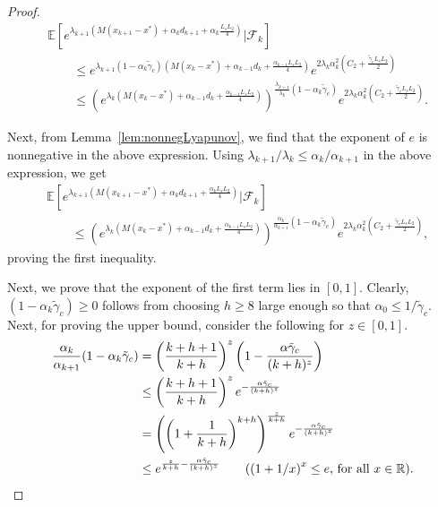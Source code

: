 \documentclass{article}
\newcommand{\numberthis}{\addtocounter{equation}{1}\tag{\theequation}}
\newcommand{\lrp}[1]{\left( #1 \right)}
\newcommand{\lrs}[1]{\left[ #1 \right]}
\newcommand{\E}[1]{\mathbb{E}\lrs{#1}}
\newcommand{\R}{\mathbb{R}}
\newcommand{\xk}{x_k}
\begin{document}
\begin{proof}
\begin{align*}
        &\E{ e^{\lambda_{k+1}\lrp{M(x_{k+1} - x^*) + \alpha_k d_{k+1} + \alpha_k \frac{L_s L_2}{4} }} \big| \mathcal F_k }\\
        &\qquad \le e^{ \lambda_{k+1}(1-\alpha_k \tilde{\gamma}_c)\lrp{M(\xk - x^*) + \alpha_{k-1}d_k + \frac{\alpha_{k-1} L_sL_2}{4} } }  e^{2 \lambda_k \alpha^2_k \lrp{C_2 + \frac{\tilde{\gamma}_c L_sL_2}{2} }}\\
        &\qquad \le \lrp{e^{ \lambda_{k}\lrp{ M(\xk - x^*) + \alpha_{k-1}d_k + \frac{\alpha_{k-1} L_sL_2}{4} }}}^{\frac{\lambda_{k+1}}{\lambda_k}(1-\alpha_k \tilde{\gamma}_c)}  e^{2 \lambda_k \alpha^2_k \lrp{C_2 + \frac{\tilde{\gamma}_c L_sL_2}{2} }}.
\end{align*}    

Next, from Lemma~\ref{lem:nonnegLyapunov}, we find that the exponent of $e$ is nonnegative in the above expression. Using $\lambda_{k+1}/\lambda_k \le \alpha_k/\alpha_{k+1}$ in the above expression, we get 
\begin{align*}
        &\E{ e^{\lambda_{k+1}\lrp{M(x_{k+1} - x^*) + \alpha_k d_{k+1} + \frac{\alpha_k L_sL_2 }{4 } }} \big| \mathcal F_k }\\
        &\qquad \le \lrp{e^{ \lambda_{k}\lrp{ M(\xk - x^*) + \alpha_{k-1}d_k + \frac{\alpha_{k-1} L_sL_2}{4}}}}^{\frac{\alpha_{k}}{\alpha_{k+1}}(1-\alpha_k \tilde{\gamma}_c)}  e^{2 \lambda_k \alpha^2_k \lrp{C_2 + \frac{\tilde{\gamma}_c L_sL_2}{2} }},%
\end{align*}
proving the first inequality.

Next, we prove that the exponent of the first term lies in $[0,1]$. Clearly, $(1-\alpha_k \tilde{\gamma}_c) \ge 0$ follows from choosing $h \ge 8$ large enough so that $\alpha_0 \le 1/\tilde{\gamma}_c$. Next, for proving the upper bound, consider the following for $z \in [0,1]$. 
\begin{align*}
    \frac{\alpha_k }{\alpha_{k+1}}(1-\alpha_k\tilde{\gamma}_c) 
    &= \lrp{\frac{k+h +1 }{k+h}}^z\lrp{1-\frac{\alpha \tilde{\gamma}_c}{(k+h)^z}}\\
    &\le \lrp{\frac{k+h+1}{k+h}}^ze^{-\frac{\alpha \tilde{\gamma}_c}{(k+h)^z}}\\
    &= \lrp{\lrp{1+\frac{1}{k+h}}^{k+h}}^\frac{z}{k+h} e^{-\frac{\alpha \tilde{\gamma}_c}{(k+h)^z}}\\
    &\le e^{ \frac{z}{k+h} - \frac{ \alpha \tilde{\gamma}_c}{(k+h)^z}} \tag{$\lrp{1+1/x}^x \le e$, for all $x \in \R$}.
\end{align*}


\end{proof}
\end{document}

